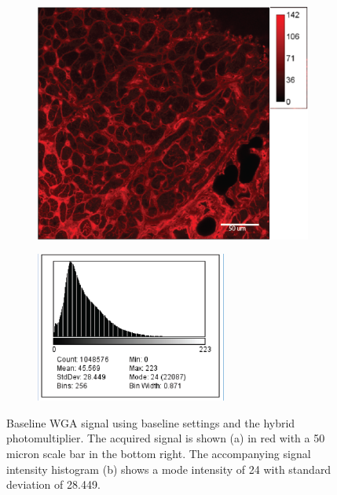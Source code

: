 \documentclass[12pt]{article}
\begin{document}
\begin{figure}[H]
	\begin{subfigure}{.5\textwidth}
		\centering
		\includegraphics[width=.95\linewidth]{FinalFigures/WGA_Baseline.png}
		\caption{}
		\label{fig:wga_b}
	\end{subfigure}%
	\begin{subfigure}{.5\textwidth}
		\centering
		\includegraphics[width=.95\linewidth]{FinalFigures/WGA_Baseline_Hist.png}
		\caption{}
		\label{fig:wga_b_hist}
	\end{subfigure}
	\caption{Baseline WGA signal using baseline settings and the hybrid photomultiplier. The acquired signal is shown (a) in red with a 50 micron scale bar in the bottom right. The accompanying signal intensity histogram (b) shows a mode intensity of 24 with standard deviation of 28.449.}
	\label{fig:wga_base}
\end{figure}
\end{document}
